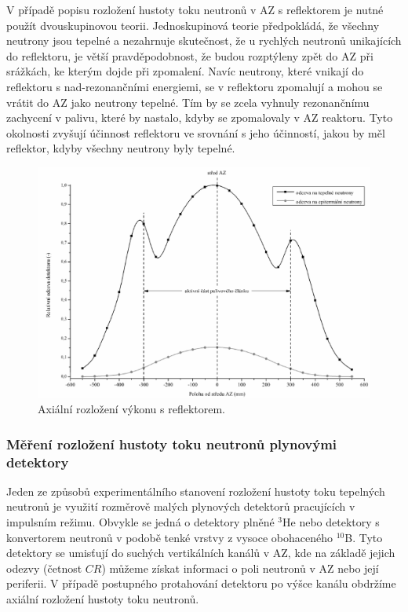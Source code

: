 V případě popisu rozložení hustoty toku neutronů v AZ s reflektorem je nutné použít dvouskupinovou teorii. Jednoskupinová teorie předpokládá, že všechny neutrony jsou tepelné a nezahrnuje skutečnost, že u rychlých neutronů unikajících do reflektoru, je větší pravděpodobnost, že budou rozptýleny zpět do AZ při srážkách, ke kterým dojde při zpomalení. Navíc neutrony, které vnikají do reflektoru s nad-rezonančními energiemi, se v reflektoru zpomalují a mohou se vrátit do AZ jako neutrony tepelné. Tím by se zcela vyhnuly rezonančnímu zachycení v palivu, které by nastalo, kdyby se zpomalovaly v AZ reaktoru. Tyto okolnosti zvyšují účinnost reflektoru ve srovnání s jeho účinností, jakou by měl reflektor, kdyby všechny neutrony byly tepelné.

\begin{figure}[H]
    \centering
    \includegraphics[scale=0.6]{img/AxiálníRozloženíVýkonu.png}
    \caption{Axiální rozložení výkonu s reflektorem.}
    \label{fig:AxiálníRozložníVýkonu}
\end{figure}

\subsubsection{Měření rozložení hustoty toku neutronů plynovými detektory}

Jeden ze způsobů experimentálního stanovení rozložení hustoty toku tepelných neutronů je využití rozměrově malých plynových detektorů pracujících v impulsním režimu. Obvykle se jedná o detektory plněné $^3$He nebo detektory s konvertorem neutronů v podobě tenké vrstvy z vysoce obohaceného $^{10}$B. Tyto detektory se umisťují do suchých vertikálních kanálů v AZ, kde na základě jejich odezvy (četnost $CR$) můžeme získat informaci o poli neutronů v AZ nebo její periferii. V případě postupného protahování detektoru po výšce kanálu obdržíme axiální rozložení hustoty toku neutronů.

